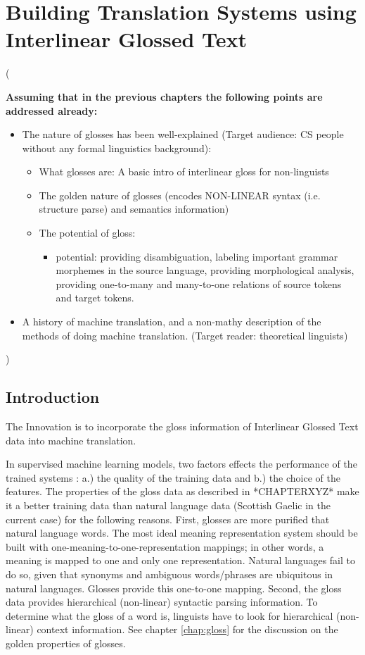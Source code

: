 \chapter{Building Translation Systems using Interlinear Glossed Text}
\label{chap:cake}

(

\textbf{Assuming that in the previous chapters the following points are addressed already:}
\begin{itemize}
\item The nature of glosses has been well-explained  (Target audience: CS people without any formal linguistics background):
	\begin{itemize}
	\item What glosses are: A basic intro of interlinear gloss for non-linguists
   \item The golden nature of glosses (encodes NON-LINEAR syntax (i.e. structure parse) and semantics information)
   \item The potential of gloss:	
		\begin{itemize}
		\item potential: providing disambiguation, labeling important grammar morphemes in the source language, providing morphological analysis, providing one-to-many and many-to-one relations of source tokens and target tokens. 
		\end{itemize}
	\end{itemize}
\item A history of machine translation, and a non-mathy description of the methods of doing machine translation. (Target reader: theoretical linguists)
\end{itemize}

               
)


\section{Introduction}
The Innovation is to incorporate the gloss information of Interlinear Glossed Text data into machine translation.

In supervised machine learning models, two factors effects the performance of the trained systems \citep{kotsiantis2007supervised}: a.) the quality of the training data and b.) the choice of the features. The properties of the gloss data as described in *CHAPTERXYZ* make it a better training data than natural language data (Scottish Gaelic in the current case) for the following reasons. First, glosses are more purified that natural language words. The most ideal meaning representation system should be built with one-meaning-to-one-representation mappings; in other words, a meaning is mapped to one and only one representation. Natural languages fail to do so, given that synonyms and ambiguous words/phrases are ubiquitous in natural languages. Glosses provide this one-to-one mapping. Second, the gloss data provides hierarchical (non-linear) syntactic parsing information. To determine what the gloss of a word is, linguists have to look for hierarchical (non-linear) context information. See chapter \ref{chap:gloss} for the discussion on the golden properties of glosses.  

